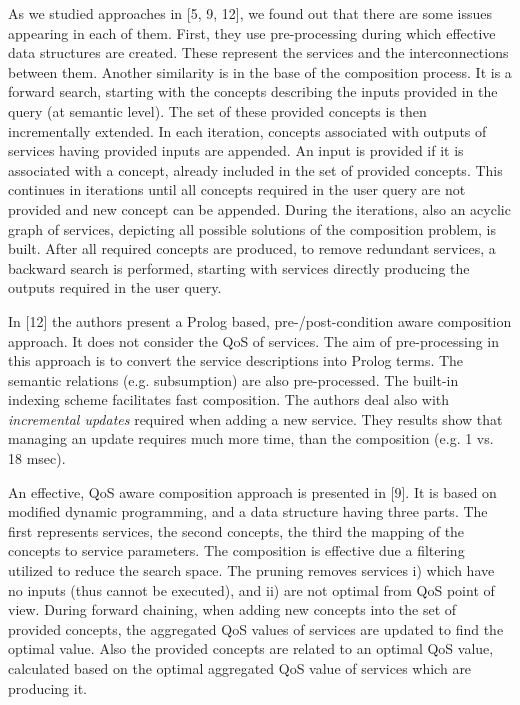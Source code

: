 \documentclass[11pt]{llncs}
\begin{document}
As we studied approaches in [5, 9, 12], we found out that there are some issues
appearing in each of them. First, they use pre-processing during which effective
data structures are created. These represent the services and the interconnections
between them. Another similarity is in the base of the composition process. It is
a forward search, starting with the concepts describing the inputs provided in the
query (at semantic level). The set of these provided concepts is then incrementally
extended. In each iteration, concepts associated with outputs of services having provided
inputs are appended. An input is provided if it is associated with a concept,
already included in the set of provided concepts. This continues in iterations until
all concepts required in the user query are not provided and new concept can be
appended. During the iterations, also an acyclic graph of services, depicting all possible
solutions of the composition problem, is built. After all required concepts are
produced, to remove redundant services, a backward search is performed, starting
with services directly producing the outputs required in the user query.

In [12] the authors present a Prolog based, pre-/post-condition aware composition
approach. It does not consider the QoS of services. The aim of pre-processing in
this approach is to convert the service descriptions into Prolog terms. The semantic
relations (e.g. subsumption) are also pre-processed. The built-in indexing scheme
facilitates fast composition. The authors deal also with \emph{incremental updates} required 
when adding a new service. They results show that managing an update requires
much more time, than the composition (e.g. 1 vs. 18 msec).

An effective, QoS aware composition approach is presented in [9]. It is based on
modified dynamic programming, and a data structure having three parts. The first
represents services, the second concepts, the third the mapping of the concepts to
service parameters. The composition is effective due a filtering utilized to reduce the
search space. The pruning removes services i) which have no inputs (thus cannot be
executed), and ii) are not optimal from QoS point of view. During forward chaining,
when adding new concepts into the set of provided concepts, the aggregated QoS
values of services are updated to find the optimal value. Also the provided concepts
are related to an optimal QoS value, calculated based on the optimal aggregated QoS
value of services which are producing it.
\end{document}
